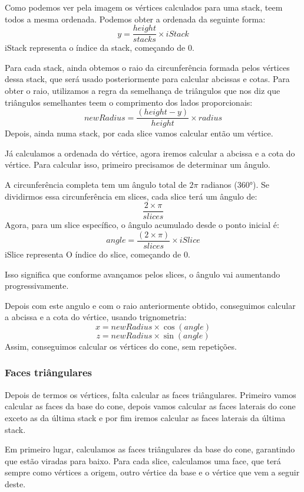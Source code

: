 \documentclass[12pt, a4paper]{article}
\begin{document}
Como podemos ver pela imagem os vértices calculados para uma stack,
teem todos a mesma ordenada. Podemos obter a ordenada da seguinte forma:
$$
y = \frac{height}{stacks} \times iStack
$$
iStack representa o índice da stack, começando de 0.

Para cada stack, ainda obtemos o raio da circunferência formada pelos vértices dessa stack,
que será usado posteriormente para calcular abcissas e cotas.
Para obter o raio, utilizamos a regra da semelhança de triângulos que nos diz que triângulos
semelhantes teem o comprimento dos lados proporcionais:
$$
newRadius = \frac{(height - y)}{height}\times radius
$$
Depois, ainda numa stack, por cada slice vamos calcular então um vértice.

Já calculamos a ordenada do vértice, agora iremos calcular a abcissa e a cota do
vértice. Para calcular isso, primeiro precisamos de determinar um ângulo.

A circunferência completa tem um ângulo total de $2\pi$ radianos (360°).
Se dividirmos essa circunferência em slices, cada slice terá um ângulo de:
$$
\frac{2 \times \pi}{slices}
$$
Agora, para um slice específico, o ângulo acumulado desde o ponto inicial é:
$$
angle = \frac{(2 \times \pi)}{slices}\times iSlice
$$
iSlice representa O índice do slice, começando de 0.

Isso significa que conforme avançamos pelos slices, o ângulo vai aumentando progressivamente.

Depois com este angulo e com o raio anteriormente obtido, conseguimos calcular a abcissa e
a cota do vértice, usando trignometria:
$$
x = newRadius \times \cos(angle)
$$
$$
z = newRadius \times \sin(angle)
$$
Assim, conseguimos calcular os vértices do cone, sem repetições.

\subsubsection{Faces triângulares}

Depois de termos os vértices, falta calcular as faces triângulares. Primeiro vamos calcular
as faces da base do cone, depois vamos calcular as faces laterais do cone exceto as da
última stack e por fim iremos calcular as faces laterais da última stack.

Em primeiro lugar, calculamos as faces triângulares da base do cone, garantindo que estão viradas
para baixo. Para cada slice, calculamos uma face, que terá sempre como vértices a origem,
outro vértice da base e o vértice que vem a seguir deste.
\end{document}
